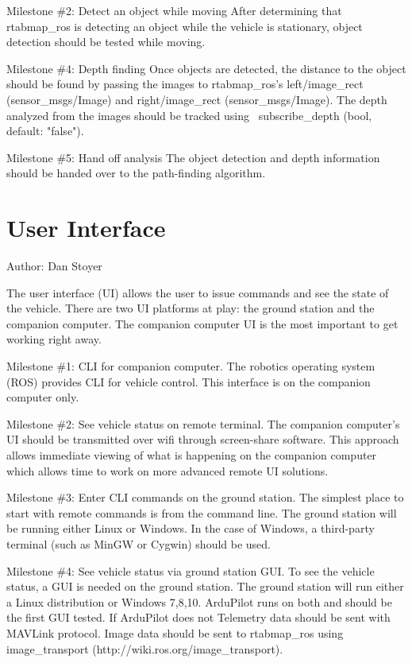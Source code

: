 \documentclass[compsoc,draftclsnofoot,onecolumn,10pt]{IEEEtran}
\begin{document}
Milestone \#2: Detect an object while moving
After determining that rtabmap\_ros is detecting an object while the vehicle is
stationary, object detection should be tested while moving.

Milestone \#4: Depth finding
Once objects are detected, the distance to the object should be found by
passing the images to rtabmap\_ros's left/image\_rect (sensor\_msgs/Image) and
right/image\_rect (sensor\_msgs/Image). The depth analyzed from the images
should be tracked using ~subscribe\_depth (bool, default: "false").

Milestone \#5: Hand off analysis
The object detection and depth information should be handed over to the
path-finding algorithm.

\section{User Interface}
Author: Dan Stoyer\par
The user interface (UI) allows the user to issue commands and see the state of
the vehicle. There are two UI platforms at play: the ground station and the companion computer.
The companion computer UI is the most important to get working right away.

Milestone \#1: CLI for companion computer.
The robotics operating system (ROS) provides CLI for vehicle control. This
interface is on the companion computer only.

Milestone \#2: See vehicle status on remote terminal.
The companion computer's UI should be transmitted over wifi through screen-share
software. This approach allows immediate viewing of what is happening on the
companion computer which allows time to work on more advanced remote UI solutions.

Milestone \#3: Enter CLI commands on the ground station.
The simplest place to start with remote commands is from the command line.
The ground station will be running either Linux or Windows. In the case of
Windows, a third-party terminal (such as MinGW or Cygwin) should be used.

Milestone \#4: See vehicle status via ground station GUI.
To see the vehicle status, a GUI is needed on the ground station. The ground
station will run either a Linux distribution or Windows 7,8,10. ArduPilot runs
on both and should be the first GUI tested. If ArduPilot does not 
Telemetry data should be sent with MAVLink protocol. Image data should be sent
to rtabmap\_ros using image\_transport (http://wiki.ros.org/image\_transport).
\end{document}
